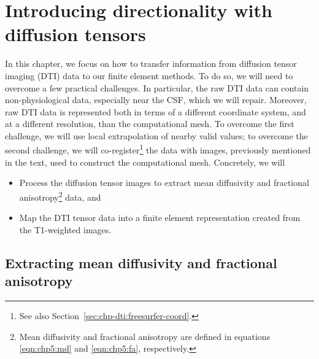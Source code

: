 \chapter{Introducing directionality with diffusion tensors}
\label{chap:dti}
In this chapter, we focus on how to transfer information from
diffusion tensor imaging (DTI) data to our finite element
methods. To do so, we will need to overcome a few practical
challenges. In particular, the raw DTI data can contain non-physiological 
data, especially near the CSF, which we will repair.  Moreover, raw DTI data 
is represented both in terms of a different coordinate system, and at a 
different resolution, than the computational mesh.  To overcome the 
first challenge, we will use local extrapolation of nearby valid values; 
to overcome the second challenge, we will co-register\footnote{
See also Section~\ref{sec:chp-dti:freesurfer-coord}.} the data 
with images, previously mentioned in the text, used to construct the 
computational mesh.  
%
Concretely, we will
\begin{itemize}
\item
  Process the diffusion tensor images to extract mean diffusivity and
  fractional anisotropy\footnote{Mean diffusivity and fractional 
  anisotropy are defined in equations \eqref{eqn:chp5:md} and 
  \eqref{eqn:chp5:fa}, respectively.} data, and
\item
  Map the DTI tensor data into a finite element representation created from
  the T1-weighted images.
\end{itemize}

\section{Extracting mean diffusivity and fractional anisotropy}

